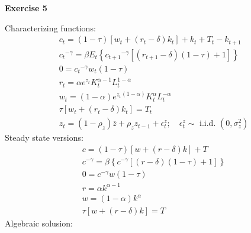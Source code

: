 \documentclass[12pt]{article}
\begin{document}
\textbf{Exercise 5} \par
    Characterizing functions:
    \begin{gather}
        c_{t}=(1-\tau)\left[w_{t}+\left(r_{t}-\delta\right) k_{t}\right]+k_{t}+T_{t}-k_{t+1} \\
        {c_{t}}^{-\gamma}=\beta E_{t}\left\{{c_{t+1}}^{-\gamma}\left[\left(r_{t+1}-\delta\right)(1-\tau)+1\right]\right\} \\
        0={c_{t}}^{-\gamma} w_{t}(1-\tau) \\
        r_{t}=\alpha e^{z_{t}} K_{t}^{\alpha - 1} L_{t}^{1-\alpha} \\
        w_{t}=(1-\alpha) {e^{z_{t}}}^{(1-\alpha)} K_{t}^{\alpha} L_{t}^{-\alpha} \\
        \tau\left[w_{t}+\left(r_{t}-\delta\right) k_{t}\right]=T_{t} \\
        z_{t}=\left(1-\rho_{z}\right) \overline{z}+\rho_{z} z_{t-1}+\epsilon_{t}^{z} ; \quad \epsilon_{t}^{z} \sim \text { i.i.d. }\left(0, \sigma_{z}^{2}\right)
    \end{gather}
    Steady state versions:
    \begin{gather}
        c=(1-\tau)\left[w+\left(r-\delta\right) k\right]+T \\
        {c}^{-\gamma}=\beta \left\{{c}^{-\gamma}\left[\left(r-\delta\right)(1-\tau)+1\right]\right\} \\
        0={c}^{-\gamma} w(1-\tau) \\
        r=\alpha k^{\alpha - 1} \\
        w=(1-\alpha) k^{\alpha} \\
        \tau\left[w+\left(r-\delta\right) k\right]=T
    \end{gather}
    Algebraic solusion:
    
\end{document}
